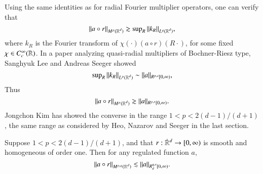Using the same identities as for radial Fourier multiplier operators, one can verify that
%
\begin{equation}
  \| a \circ r \|_{M^p(\operatorname{\mathbb{R}}^d)} \gtrsim \sup\nolimits_R \| k_R \|_{L^q(\operatorname{\mathbb{R}}^d)},
\end{equation}
%
where $k_R$ is the Fourier transform of $\chi(\cdot) (a \circ r)(R \cdot)$, for some fixed $\chi \in C_c^\infty(\operatorname{\mathbb{R}})$. In a paper analyzing quasi-radial multipliers of Bochner-Riesz type, Sanghyuk Lee and Andreas Seeger \cite{LeeSeeger2} showed
%
\begin{equation}
  \sup\nolimits_R \| k_R \|_{L^p(\operatorname{\mathbb{R}}^d)} \sim \| a \|_{R^{p,s}[0,\infty)},
\end{equation}
%
Thus
%
\begin{equation} \label{auiwodjawiodjawoi2342342}
  \| a \circ r \|_{M^p(\operatorname{\mathbb{R}}^d)} \gtrsim \| a \|_{R^{p,s}[0,\infty)}.
\end{equation}
%
Jongchon Kim \cite{KimQuasiradial} has showed the converse in the range $1 < p < 2(d-1)/(d+1)$, the same range as considered by Heo, Nazarov and Seeger in the last section.

\begin{theorem}
  Suppose $1 < p < 2(d-1)/(d+1)$, and that $r: {\dot{\RR}{\vphantom{\RR}}^d} \to [0,\infty)$ is smooth and homogeneous of order one. Then for any regulated function $a$,
  \[ \| a \circ r \|_{M^{p,q}(\operatorname{\mathbb{R}}^d)} \lesssim \| a \|_{R^{q,s}_d[0,\infty)}. \]
\end{theorem}

